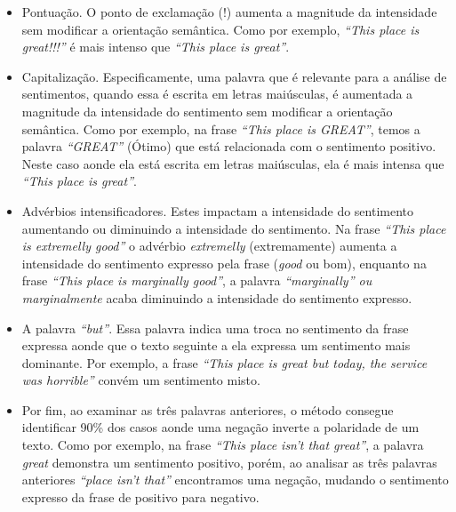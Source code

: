 \begin{itemize}
  \item Pontuação. O ponto de exclamação (!) aumenta a magnitude da
  intensidade sem modificar a orientação semântica. Como por exemplo,
  \textit{``This place is great!!!''} é mais intenso que \textit{``This place
  is great''}.
  \item Capitalização. Especificamente, uma palavra que é relevante para a
  análise de sentimentos, quando essa é escrita em letras maiúsculas, é
  aumentada a magnitude da intensidade do sentimento sem modificar a orientação
  semântica. Como por exemplo, na frase \textit{``This place is GREAT''}, temos
  a palavra \textit{``GREAT''} (Ótimo) que está relacionada com o sentimento
  positivo. Neste caso aonde ela está escrita em letras maiúsculas, ela é mais
  intensa que \textit{``This place is great''}.
  \item Advérbios intensificadores. Estes impactam a intensidade do sentimento
  aumentando ou diminuindo a intensidade do sentimento. Na frase \textit{``This
  place is extremelly good''} o advérbio \textit{extremelly} (extremamente)
  aumenta a intensidade do sentimento expresso pela frase (\textit{good} ou
  bom), enquanto na frase \textit{``This place is marginally good''}, a palavra
  \textit{``marginally'' ou marginalmente} acaba diminuindo a intensidade do
  sentimento expresso.
  \item A palavra \textit{``but''}. Essa palavra indica uma troca no sentimento
  da frase expressa aonde que o texto seguinte a ela expressa um sentimento mais
  dominante. Por exemplo, a frase \textit{``This place is great but today, the
  service was horrible''} convém um sentimento misto.
  \item Por fim, ao examinar as três palavras anteriores, o método consegue
  identificar 90\% dos casos aonde uma negação inverte a polaridade de um texto.
  Como por exemplo, na frase \textit{``This place isn't that great''}, a
  palavra \textit{great} demonstra um sentimento positivo, porém, ao analisar
  as três palavras anteriores \textit{``place isn't that''} encontramos uma
  negação, mudando o sentimento expresso da frase de positivo para negativo.
\end{itemize}
